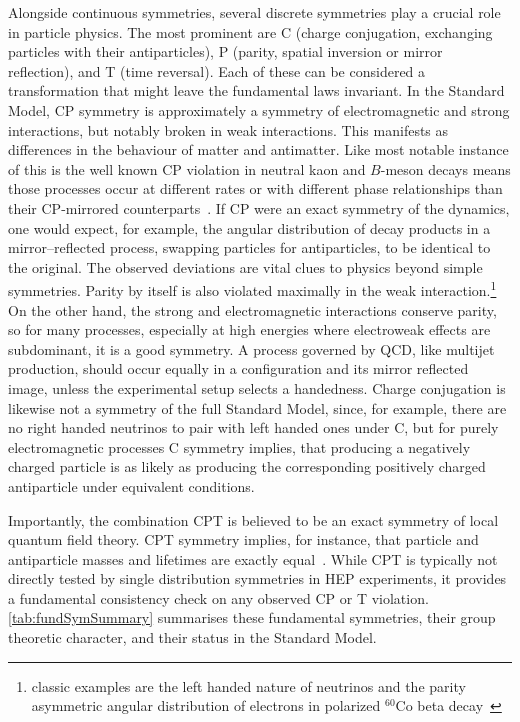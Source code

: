         Alongside continuous symmetries, several discrete symmetries play a crucial role in particle physics.
        The most prominent are C (charge conjugation, exchanging particles with their antiparticles), P (parity, spatial inversion or mirror reflection), and T (time reversal).
        Each of these can be considered a transformation that might leave the fundamental laws invariant.
        In the Standard Model, CP symmetry is approximately a symmetry of electromagnetic and strong interactions, but notably broken in weak interactions.
        This manifests as differences in the behaviour of matter and antimatter.
        Like most notable instance of this is the well known CP violation in neutral kaon and $B$-meson decays means those processes occur at different rates or with different phase relationships than their CP-mirrored counterparts~\cite{Neubert:1996qg}.
        If CP were an exact symmetry of the dynamics, one would expect, for example, the angular distribution of decay products in a mirror--reflected process, swapping particles for antiparticles, to be identical to the original.
        The observed deviations are vital clues to physics beyond simple symmetries.
        Parity by itself is also violated maximally in the weak interaction.\footnote{ classic examples are the left handed nature of neutrinos and the parity asymmetric angular distribution of electrons in polarized $^{60}$Co beta decay~\cite{Wu:1957my}}
        On the other hand, the strong and electromagnetic interactions conserve parity, so for many processes, especially at high energies where electroweak effects are subdominant, it is a good symmetry.
        A process governed by QCD, like multijet production, should occur equally in a configuration and its mirror reflected image, unless the experimental setup selects a handedness.
        Charge conjugation is likewise not a symmetry of the full Standard Model, since, for example, there are no right handed neutrinos to pair with left handed ones under C, but for purely electromagnetic processes C symmetry implies, that producing a negatively charged particle is as likely as producing the corresponding positively charged antiparticle under equivalent conditions.
        
        Importantly, the combination CPT is believed to be an exact symmetry of local quantum field theory.
        CPT symmetry implies, for instance, that particle and antiparticle masses and lifetimes are exactly equal~\cite{Kostelecky:1998ic}.
        While CPT is typically not directly tested by single distribution symmetries in HEP experiments, it provides a fundamental consistency check on any observed CP or T violation. \cref{tab:fundSymSummary} summarises these fundamental symmetries, their group theoretic character, and their status in the Standard Model.


